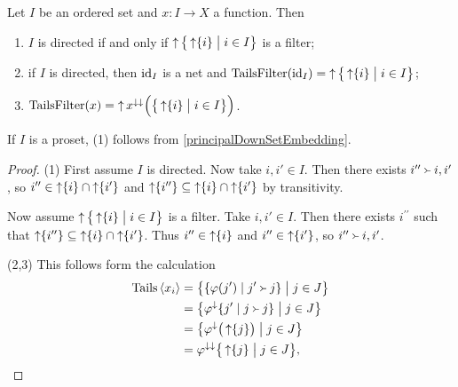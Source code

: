 \begin{lemma} \label{directednessEquivalentToDownsetsFilter}
Let $I$ be an ordered set and $x: I\to X$ a function. Then
\begin{enumerate}
\item $I$ is directed \textup{if and only if} $\upset\setbuilder[\big]{\upset\{i\}}{i\in I}$ is a filter;
\item if $I$ is directed, then $\operatorname{id}_I$ is a net and $\TailsFilter(\id_I) = \upset\setbuilder[\big]{\upset\{i\}}{i\in I}$;
\item $\TailsFilter(x) = \upset x^{\imf\imf}\Big(\setbuilder[\big]{\upset\{i\}}{i\in I}\Big)$.
\end{enumerate}
\end{lemma}
If $I$ is a proset, (1) follows from \ref{principalDownSetEmbedding}.
\begin{proof}
(1) First assume $I$ is directed. Now take $i,i'\in I$. Then there exists $i^{\prime\prime}\Yright i,i'$, so $i^{\prime\prime} \in \operatorname{\uparrow}\{i\}\cap \operatorname{\uparrow} \{i'\}$ and $\operatorname{\uparrow}\{i^{\prime\prime}\} \subseteq \operatorname{\uparrow}\{i\}\cap \operatorname{\uparrow} \{i'\}$ by transitivity.

Now assume $\upset\setbuilder[\big]{\upset\{i\}}{i\in I}$ is a filter. Take $i,i'\in I$. Then there exists $i^{\prime\prime}$ such that $\operatorname{\uparrow}\{i^{\prime\prime}\} \subseteq \operatorname{\uparrow}\{i\}\cap \operatorname{\uparrow}\{i'\}$. Thus $i^{\prime\prime} \in \operatorname{\uparrow}\{i\}$ and $i^{\prime\prime} \in \operatorname{\uparrow}\{i'\}$, so $i^{\prime\prime} \Yright i,i'$.

(2,3) This follows form the calculation
\begin{align*}
\Tails\seq{x_i} &= \setbuilder[\big]{\setbuilder{\varphi(j')}{j' \Yright j}}{j\in J} \\
&= \setbuilder[\big]{\varphi^\imf\setbuilder{j'}{j \Yright j}}{j\in J} \\
&= \setbuilder[\big]{\varphi^\imf\big(\upset\{j\}\big)}{j\in J} \\
&= \varphi^{\imf\imf}\setbuilder[\big]{\upset\{j\}}{j\in J},
\end{align*}
\end{proof}


